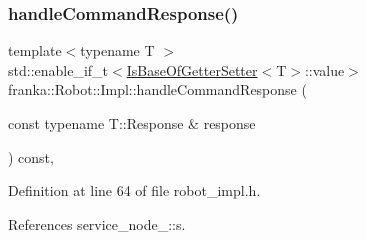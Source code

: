 \mbox{\label{classfranka_1_1Robot_1_1Impl_ac281e9292f59718758b2c9897b004776}} 
\subsubsection{\texorpdfstring{handle\+Command\+Response()}{handleCommandResponse()}\hspace{0.1cm}{\footnotesize\ttfamily [1/2]}}
{\footnotesize\ttfamily template$<$typename T $>$ \\
std\+::enable\+\_\+if\+\_\+t$<$\hyperlink{classfranka_1_1Robot_1_1Impl_a42d57d169b53c906439dbbde255c1bae}{Is\+Base\+Of\+Getter\+Setter}$<$T$>$\+::value$>$ franka\+::\+Robot\+::\+Impl\+::handle\+Command\+Response (\begin{DoxyParamCaption}\item[{const typename T\+::\+Response \&}]{response }\end{DoxyParamCaption}) const\hspace{0.3cm}{\ttfamily [inline]}, {\ttfamily [private]}}



Definition at line 64 of file robot\+\_\+impl.\+h.



References service\+\_\+node\+\_\+::s.


